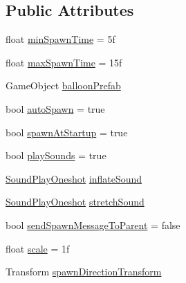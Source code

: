 \subsection*{Public Attributes}
\begin{DoxyCompactItemize}
\item 
float \mbox{\hyperlink{class_valve_1_1_v_r_1_1_interaction_system_1_1_balloon_spawner_a99f188c2afd9fad7cbb8a244be8fb566}{min\+Spawn\+Time}} = 5f
\item 
float \mbox{\hyperlink{class_valve_1_1_v_r_1_1_interaction_system_1_1_balloon_spawner_a77c1d246ff25919e49fb5296d223e13a}{max\+Spawn\+Time}} = 15f
\item 
Game\+Object \mbox{\hyperlink{class_valve_1_1_v_r_1_1_interaction_system_1_1_balloon_spawner_a61c487144e94b68e0fc89e0e0a75c0b4}{balloon\+Prefab}}
\item 
bool \mbox{\hyperlink{class_valve_1_1_v_r_1_1_interaction_system_1_1_balloon_spawner_a128f315c5a5e2aac1c8ca8d19767231a}{auto\+Spawn}} = true
\item 
bool \mbox{\hyperlink{class_valve_1_1_v_r_1_1_interaction_system_1_1_balloon_spawner_afe9df95ec091129c3cfbf5215f4e9578}{spawn\+At\+Startup}} = true
\item 
bool \mbox{\hyperlink{class_valve_1_1_v_r_1_1_interaction_system_1_1_balloon_spawner_ae24c7d61f6eb5d7a280f7d1f3ebf1a16}{play\+Sounds}} = true
\item 
\mbox{\hyperlink{class_valve_1_1_v_r_1_1_interaction_system_1_1_sound_play_oneshot}{Sound\+Play\+Oneshot}} \mbox{\hyperlink{class_valve_1_1_v_r_1_1_interaction_system_1_1_balloon_spawner_ac63305fa900733b620a126f17cc32e58}{inflate\+Sound}}
\item 
\mbox{\hyperlink{class_valve_1_1_v_r_1_1_interaction_system_1_1_sound_play_oneshot}{Sound\+Play\+Oneshot}} \mbox{\hyperlink{class_valve_1_1_v_r_1_1_interaction_system_1_1_balloon_spawner_a82d94aaf885611fe99ac11254e0217cf}{stretch\+Sound}}
\item 
bool \mbox{\hyperlink{class_valve_1_1_v_r_1_1_interaction_system_1_1_balloon_spawner_a4762e8fa99cd6f9e721c1c929029bb81}{send\+Spawn\+Message\+To\+Parent}} = false
\item 
float \mbox{\hyperlink{class_valve_1_1_v_r_1_1_interaction_system_1_1_balloon_spawner_a171f67eef1f6e1b74dad8fec17c6e3b8}{scale}} = 1f
\item 
Transform \mbox{\hyperlink{class_valve_1_1_v_r_1_1_interaction_system_1_1_balloon_spawner_a901e009d515f8045005957497e55d6fe}{spawn\+Direction\+Transform}}
\item 

\end{DoxyCompactItemize}
